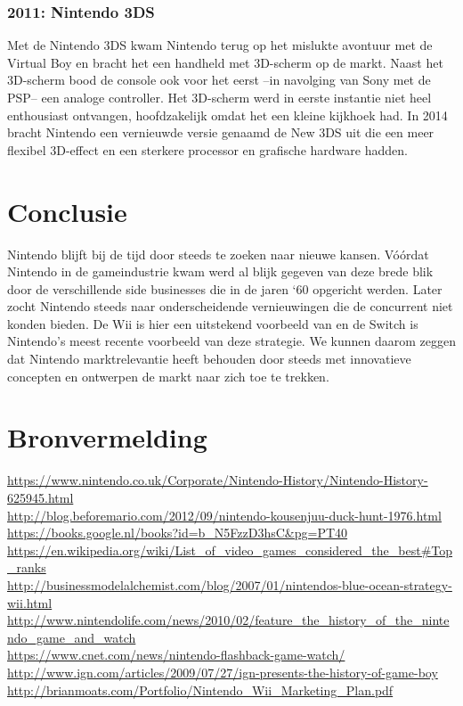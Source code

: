 \documentclass{article}
\begin{document}
\subsubsection{2011: Nintendo 3DS}
Met de Nintendo 3DS kwam Nintendo terug op het mislukte avontuur met de Virtual Boy en bracht het een handheld met 3D-scherm op de markt. Naast het 3D-scherm bood de console ook voor het eerst --in navolging van Sony met de PSP-- een analoge controller. Het 3D-scherm werd in eerste instantie niet heel enthousiast ontvangen, hoofdzakelijk omdat het een kleine kijkhoek had. In 2014 bracht Nintendo een vernieuwde versie genaamd de New 3DS uit die een meer flexibel 3D-effect en een sterkere processor en grafische hardware hadden.

\section{Conclusie}
Nintendo blijft bij de tijd door steeds te zoeken naar nieuwe kansen. V\'o\'ordat Nintendo in de gameindustrie kwam werd al blijk gegeven van deze brede blik door de verschillende side businesses die in de jaren `60 opgericht werden. Later zocht Nintendo steeds naar onderscheidende vernieuwingen die de concurrent niet konden bieden. De Wii is hier een uitstekend voorbeeld van en de Switch is Nintendo's meest recente voorbeeld van deze strategie. We kunnen daarom zeggen dat Nintendo marktrelevantie heeft behouden door steeds met innovatieve concepten en ontwerpen de markt naar zich toe te trekken.
\section{Bronvermelding}
\url{https://www.nintendo.co.uk/Corporate/Nintendo-History/Nintendo-History-625945.html}\\ 
\url{http://blog.beforemario.com/2012/09/nintendo-kousenjuu-duck-hunt-1976.html}\\ 
\url{https://books.google.nl/books?id=b_N5FzzD3hsC&pg=PT40}\\ 
\url{https://en.wikipedia.org/wiki/List_of_video_games_considered_the_best#Top_ranks}\\ 
\url{http://businessmodelalchemist.com/blog/2007/01/nintendos-blue-ocean-strategy-wii.html}\\ 
\url{http://www.nintendolife.com/news/2010/02/feature_the_history_of_the_nintendo_game_and_watch}\\ 
\url{https://www.cnet.com/news/nintendo-flashback-game-watch/}\\ 
\url{http://www.ign.com/articles/2009/07/27/ign-presents-the-history-of-game-boy}\\ 
\url{http://brianmoats.com/Portfolio/Nintendo_Wii_Marketing_Plan.pdf}\\ 
\end{document}
